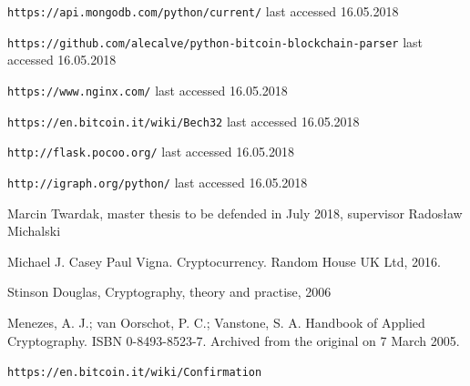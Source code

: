 \documentclass[12pt, en, eng, oneside, final]{mgr}
\begin{document}
\begin{thebibliography}{9}
\texttt{https://api.mongodb.com/python/current/} last accessed 16.05.2018

\texttt{https://github.com/alecalve/python-bitcoin-blockchain-parser} last accessed 16.05.2018 

\texttt{https://www.nginx.com/} last accessed 16.05.2018

\texttt{https://en.bitcoin.it/wiki/Bech32} last accessed 16.05.2018

\texttt{http://flask.pocoo.org/} last accessed 16.05.2018

\texttt{http://igraph.org/python/} last accessed 16.05.2018

Marcin Twardak, master thesis to be defended in July 2018, supervisor Radosław Michalski

Michael J. Casey Paul Vigna. Cryptocurrency. Random House UK Ltd, 2016.

Stinson Douglas, Cryptography, theory and practise, 2006

Menezes, A. J.; van Oorschot, P. C.; Vanstone, S. A. Handbook of Applied Cryptography. ISBN 0-8493-8523-7. Archived from the original on 7 March 2005.

\texttt{https://en.bitcoin.it/wiki/Confirmation}

\end{thebibliography}
\end{document}
